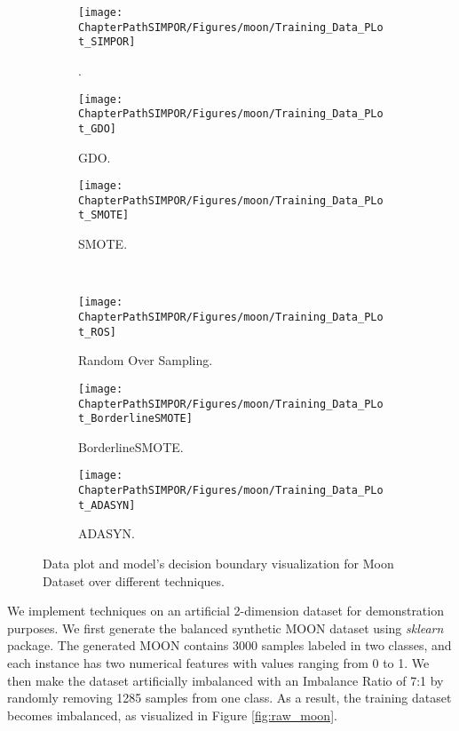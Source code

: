 \begin{figure*}[t!]
	\centering
	\begin{subfigure}[]{0.3\linewidth}
		\texttt{[image: \\ChapterPathSIMPOR/Figures/moon/Training\_Data\_PLot\_SIMPOR]}
		\caption{\Methodname{}.}
		\label{fig:simpor_moon}
	\end{subfigure}
	\hspace{0.1em}%
	\begin{subfigure}[]{0.3\linewidth}
		\texttt{[image: \\ChapterPathSIMPOR/Figures/moon/Training\_Data\_PLot\_GDO]}
		\caption{GDO.}
		\label{fig:gdo_moon}
	\end{subfigure}
	\hspace{0.1em}%
	\begin{subfigure}[]{0.3\linewidth}
		\texttt{[image: \\ChapterPathSIMPOR/Figures/moon/Training\_Data\_PLot\_SMOTE]}
		\caption{SMOTE.}
		\label{fig:smote_moon}
	\end{subfigure}
	\\
	\begin{subfigure}[]{0.3\linewidth}
		\texttt{[image: \\ChapterPathSIMPOR/Figures/moon/Training\_Data\_PLot\_ROS]}
		\caption{ Random Over Sampling.}
		\label{fig:oversampling_moon}
	\end{subfigure}
	\hspace{0.1em}%
	\begin{subfigure}[]{0.3\linewidth}
		\texttt{[image: \\ChapterPathSIMPOR/Figures/moon/Training\_Data\_PLot\_BorderlineSMOTE]}
		\caption{BorderlineSMOTE.}
		\label{fig:border_smote_moon}
	\end{subfigure}
	\hspace{0.1em}%
	\begin{subfigure}[]{0.3\linewidth}
		\texttt{[image: \\ChapterPathSIMPOR/Figures/moon/Training\_Data\_PLot\_ADASYN]}
		\caption{ADASYN. }
		\label{fig:adasyn_moon}
	\end{subfigure}
	
	\caption[Data and model decision boundary plot.]{Data plot and model's decision boundary visualization for Moon Dataset over different techniques.}
	\label{fig:MoonResults}
\end{figure*}


We implement techniques on an artificial 2-dimension dataset for demonstration purposes. We first generate the balanced synthetic MOON dataset using \textit{sklearn} package. The generated MOON contains 3000 samples labeled in two classes, and each instance has two numerical features with values ranging from 0 to 1. We then make the dataset artificially imbalanced with an Imbalance Ratio of 7:1 by randomly removing 1285 samples from one class. As a result, the training dataset becomes imbalanced, as visualized in Figure \ref{fig:raw_moon}.


